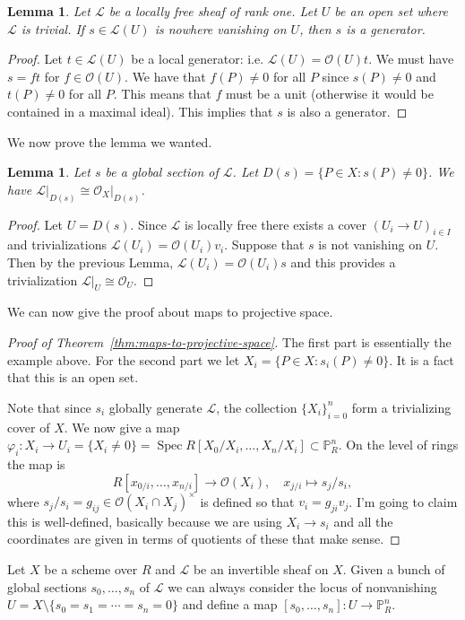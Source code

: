 \documentclass[12pt]{article}
\numberwithin{equation}{section}
\newtheorem{lemma}[theorem]{Lemma}
\theoremstyle{definition}
\theoremstyle{remark}
\newcommand{\Ocal}{\mathcal{O}}
\newcommand{\PP}{\mathbb{P}}
\newcommand{\Spec}{\operatorname{Spec}}
\newcommand{\Lcal}{\mathcal{L}}
\begin{document}
\begin{lemma}
	Let $\Lcal$ be a locally free sheaf of rank one. 
	Let $U$ be an open set where $\Lcal$ is trivial. 
	If $s \in \Lcal(U)$ is nowhere vanishing on $U$, then $s$ is a generator.  
\end{lemma}
\begin{proof}
	Let $t \in \Lcal(U)$ be a local generator: i.e. $\Lcal(U) = \Ocal(U)t$.
	We must have $s = ft$ for $f\in\Ocal(U)$. 
	We have that $f(P) \neq 0$ for all $P$ since $s(P)\neq 0$ and  $t(P)\neq 0$ for all $P$. 
	This means that $f$ must be a unit (otherwise it would be contained in a maximal ideal). 
	This implies that $s$ is also a generator.
\end{proof}
We now prove the lemma we wanted.
\begin{lemma}
	Let $s$ be a global section of $\Lcal$. 
	Let $D(s) = \lbrace P \in X \colon s(P) \neq 0\rbrace$. 
	We have $\Lcal\vert_{D(s)} \cong \Ocal_X\vert_{D(s)}$.
\end{lemma}
\begin{proof}
	Let $U = D(s)$.
	Since $\Lcal$ is locally free there exists a cover $(U_i \to U)_{i\in I}$ and trivializations $\Lcal(U_i) = \Ocal(U_i)v_i$. 
	Suppose that $s$ is not vanishing on $U$. 
	Then by the previous Lemma, $\Lcal(U_i) = \Ocal(U_i)s$ and this provides a trivialization $\Lcal\vert_U \cong \Ocal_U$.
\end{proof}
We can now give the proof about maps to projective space. 
\begin{proof}[Proof of Theorem~\ref{thm:maps-to-projective-space}]
	The first part is essentially the example above. 
	For the second part we let $X_i = \lbrace P \in X \colon s_i(P)\neq 0 \rbrace$. 
	It is a fact that this is an open set. 
	
	Note that since $s_i$ globally generate $\Lcal$, the collection $\lbrace X_i \rbrace_{i=0}^n$ form a trivializing cover of $X$.
	We now give a map $\varphi_i\colon X_i \to U_i = \lbrace X_i \neq 0 \rbrace  = \Spec R[X_0/X_i,\ldots,X_n/X_i] \subset \PP^n_R$. 
	On the level of rings the map is
	$$ R[x_{0/i},\ldots, x_{n/i}] \to \Ocal(X_i), \quad x_{j/i} \mapsto s_j/s_i, $$
	where $s_j/s_i =g_{ij} \in \Ocal(X_i\cap X_j)^{\times}$ is defined so that $v_i = g_{ji} v_j$. 
	I'm going to claim this is well-defined, basically because we are using $X_i \to s_i$ and all the coordinates are given in terms of quotients of these that make sense.
\end{proof}


Let $X$ be a scheme over $R$ and $\Lcal$ be an invertible sheaf on $X$. 
Given a bunch of global sections $s_0,\ldots,s_n$ of $\Lcal$ we can always consider the locus of nonvanishing $U = X \setminus \lbrace s_0=s_1=\cdots=s_n=0\rbrace$ and define a map $[s_0,\ldots,s_n]: U \to \PP^n_R$. 
\end{document}
